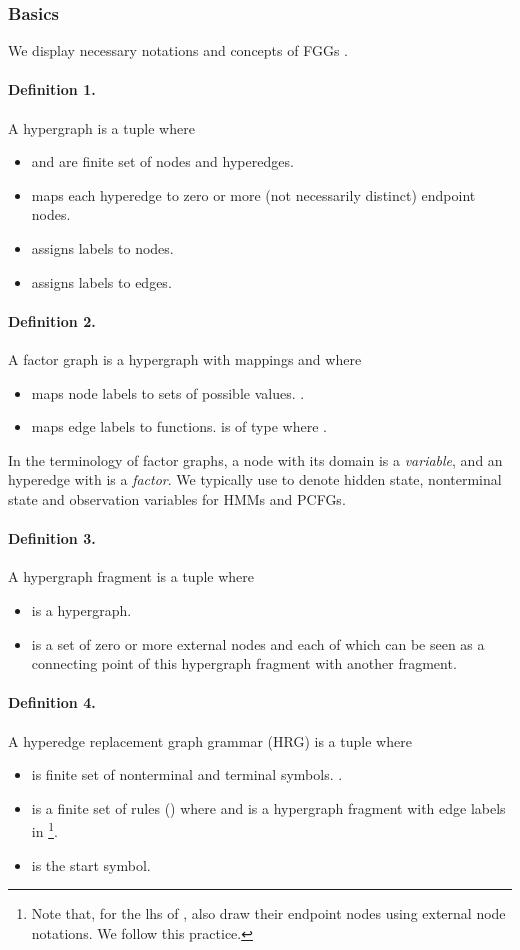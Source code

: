 \documentclass[11pt]{article}
\begin{document}
\subsubsection{Basics}
 We display necessary notations and concepts of FGGs \cite[][]{DBLP:conf/nips/0001R20}.
\paragraph{Definition 1.} A hypergraph is a tuple  where 
\begin{itemize}
    \item  and  are finite set of nodes and hyperedges.
    \item  maps each hyperedge to zero or more (not necessarily distinct) endpoint nodes.
    \item   assigns labels to nodes.
    \item  assigns labels to edges.
\end{itemize}


\paragraph{Definition 2.} A factor graph is a hypergraph with mappings  and  where
\begin{itemize}
    \item   maps node labels to sets of possible values. .
    \item   maps edge labels to functions.  is of type  where .
\end{itemize}
In the terminology of factor graphs, a node  with its domain  is a \textit{variable}, and an hyperedge  with  is a \textit{factor}.  We typically use  to denote hidden state, nonterminal state and observation variables for HMMs and PCFGs.

\paragraph{Definition 3.} A hypergraph fragment is a tuple  where
\begin{itemize}
    \item  is a hypergraph.
    \item  is a set of zero or more external nodes and each of which can be seen as a connecting point of this hypergraph fragment with another fragment.
\end{itemize}
\paragraph{Definition 4.} A hyperedge replacement graph grammar (HRG) \cite{DBLP:conf/gg/DrewesKH97} is a tuple  where 
\begin{itemize}
    \item  is finite set of nonterminal and terminal symbols. .
    \item  is a finite set of rules () where 
              and  is a hypergraph fragment with edge labels in  \footnote{Note that, for the lhs of , \citet{DBLP:conf/nips/0001R20} also draw their endpoint nodes using external node notations. We follow this practice.}.
    \item  is the start symbol.
\end{itemize}
\end{document}
